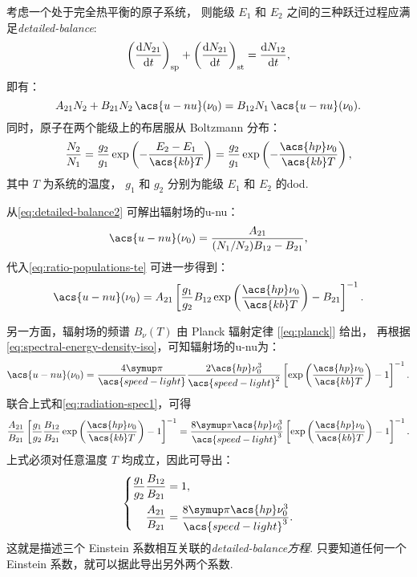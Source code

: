 考虑一个处于完全热平衡的原子系统，
则能级 $E_1$ 和 $E_2$ 之间的三种跃迁过程应满足\emph{\acf{detailed-balance}}:
\begin{equation}
  \label{eq:detailed-balance1}
  \left( \frac{\mathrm{d}N_{21}}{\mathrm{d}t} \right)_{\mathrm{sp}}
    + \left( \frac{\mathrm{d}N_{21}}{\mathrm{d}t} \right)_{\mathrm{st}} = \frac{\mathrm{d}N_{12}}{\mathrm{d}t} ,
\end{equation}
即有：
\begin{equation}
  \label{eq:detailed-balance2}
  A_{21} N_2 + B_{21} N_2 \, \acs{u-nu}(\nu_0)
    = B_{12} N_1 \, \acs{u-nu}(\nu_0) .
\end{equation}
同时，原子在两个能级上的布居服从 Boltzmann 分布：
\begin{equation}
  \label{eq:ratio-populations-te}
  \frac{N_2}{N_1}
    = \frac{g_2}{g_1} \exp\left( - \frac{E_2-E_1}{\acs{kb} T} \right)
    = \frac{g_2}{g_1} \exp\left( - \frac{\acs{hp} \nu_0}{\acs{kb} T} \right) ,
\end{equation}
其中 $T$ 为系统的温度，
$g_1$ 和 $g_2$ 分别为能级 $E_1$ 和 $E_2$ 的\acf{dod}.

从\autoref{eq:detailed-balance2} 可解出辐射场的\acl{u-nu}：
\begin{equation}
  \acs{u-nu}(\nu_0) = \frac{A_{21}}{(N_1/N_2) B_{12} - B_{21}} ,
\end{equation}
代入\autoref{eq:ratio-populations-te} 可进一步得到：
\begin{equation}
  \label{eq:radiation-spec1}
  \acs{u-nu}(\nu_0) = A_{21} \left[ \frac{g_1}{g_2} B_{12}
    \exp\left( \frac{\acs{hp} \nu_0}{\acs{kb} T} \right)
    - B_{21} \right]^{-1} .
\end{equation}

另一方面，辐射场的频谱 $B_{\nu}(T)$ 由 Planck 辐射定律 [\autoref{eq:planck}] 给出，
再根据\autoref{eq:spectral-energy-density-iso}，可知辐射场的\acl{u-nu}为：
\begin{equation}
  \label{eq:radiation-spec2}
  \acs{u-nu}(\nu_0) = \frac{4\Cpi}{\acs{speed-light}}
    \frac{2 \acs{hp} \nu_0^3}{\acs{speed-light}^2}
    \left[ \exp\left( \frac{\acs{hp} \nu_0}{\acs{kb} T} \right)
      - 1 \right]^{-1} .
\end{equation}
联合上式和\autoref{eq:radiation-spec1}，可得
\begin{equation}
  \frac{A_{21}}{B_{21}} \left[ \frac{g_1}{g_2} \frac{B_{12}}{B_{21}}
    \exp\left( \frac{\acs{hp} \nu_0}{\acs{kb} T} \right) - 1 \right]^{-1}
  = \frac{8\Cpi \acs{hp} \nu_0^3}{\acs{speed-light}^3}
    \left[ \exp\left( \frac{\acs{hp} \nu_0}{\acs{kb} T} \right)
      - 1 \right]^{-1} .
\end{equation}
上式必须对任意温度 $T$ 均成立，因此可导出：
\begin{equation}
  \label{eq:detailed-balance}
  \left\{
    \begin{aligned}
      \frac{g_1}{g_2} \frac{B_{12}}{B_{21}} & = 1 , \\
      \frac{A_{21}}{B_{21}} & =
        \frac{8\Cpi \acs{hp} \nu_0^3}{\acs{speed-light}^3} .
    \end{aligned}
  \right.
\end{equation}
这就是描述三个 Einstein 系数相互关联的\emph{\ac{detailed-balance}方程}.
只要知道任何一个 Einstein 系数，就可以据此导出另外两个系数.

